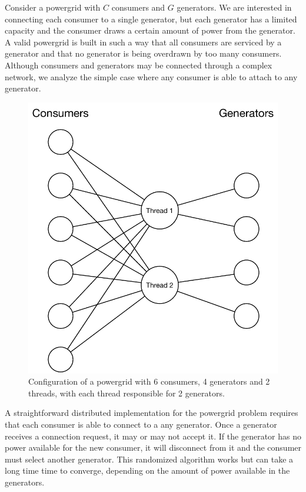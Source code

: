 Consider a powergrid with $C$ consumers and $G$ generators. We are interested
in connecting each consumer to a single generator, but each generator has a
limited capacity and the consumer draws a certain amount of power from the
generator. A valid powergrid is built in such a way that all consumers are
serviced by a generator and that no generator is being overdrawn by too many
consumers. Although consumers and generators may be connected through a complex
network, we analyze the simple case where any consumer is able to attach to any
generator.

\begin{figure}
   \begin{center}
      \includegraphics[width=1\linewidth]{figures/threads/powergrid.pdf}
   \end{center}
   \caption{Configuration of a powergrid with 6 consumers, 4
      generators and 2 threads, with each thread responsible for 2 generators.}
   \label{fig:threads:powergrid}
\end{figure}

A straightforward distributed implementation for the powergrid problem requires
that each consumer is able to connect to a any generator.  Once a generator
receives a connection request, it may or may not accept it.  If the generator
has no power available for the new consumer, it will disconnect from it and the
consumer must select another generator. This randomized algorithm works but can
take a long time time to converge, depending on the amount of power available in
the generators.

